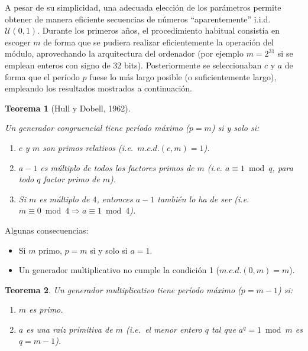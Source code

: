 \documentclass[
]{book}
\theoremstyle{break}
\newtheorem{theorem}{Teorema}[chapter]
\theoremstyle{nonumberplain}
\begin{document}
A pesar de su simplicidad, una adecuada elección de los parámetros permite obtener de manera eficiente secuencias de números ``aparentemente'' i.i.d. \(\mathcal{U}(0,1)\).
Durante los primeros años, el procedimiento habitual consistía en escoger \(m\) de forma que se pudiera realizar eficientemente la operación del módulo, aprovechando la arquitectura del ordenador (por ejemplo \(m = 2^{31}\) si se emplean enteros con signo de 32 bits).
Posteriormente se seleccionaban \(c\) y \(a\) de forma que el período \(p\) fuese lo más largo posible (o suficientemente largo), empleando los resultados mostrados a continuación.

\begin{theorem}[Hull y Dobell, 1962]
\protect\hypertarget{thm:hull-dobell}{}\label{thm:hull-dobell}

Un generador congruencial tiene período máximo (\(p=m\)) si y solo si:

\begin{enumerate}
\def\labelenumi{\arabic{enumi}.}
\item
  \(c\) y \(m\) son primos relativos (i.e.~\(m.c.d.(c, m) = 1\)).
\item
  \(a-1\) es múltiplo de todos los factores primos de \(m\) (i.e.
  \(a \equiv 1 \bmod q\), para todo \(q\) factor primo de \(m\)).
\item
  Si \(m\) es múltiplo de \(4\), entonces \(a-1\) también lo ha de
  ser (i.e.~\(m \equiv 0 \bmod 4\Rightarrow a \equiv 1 \bmod 4\)).
\end{enumerate}

\end{theorem}

Algunas consecuencias:

\begin{itemize}
\item
  Si \(m\) primo, \(p=m\) si y solo si \(a=1\).
\item
  Un generador multiplicativo no cumple la condición 1 (\(m.c.d.(0, m)=m\)).
\end{itemize}

\begin{theorem}

Un generador multiplicativo tiene período máximo (\(p=m-1\)) si:

\begin{enumerate}
\def\labelenumi{\arabic{enumi}.}
\item
  \(m\) es primo.
\item
  \(a\) es una raiz primitiva de \(m\) (i.e.~el menor entero \(q\) tal
  que \(a^{q}=1 \bmod m\) es \(q=m-1\)).
\end{enumerate}

\end{theorem}
\end{document}
